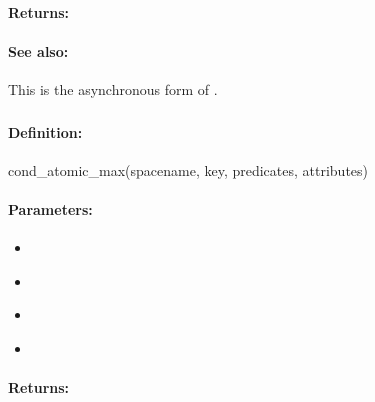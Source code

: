 \paragraph{Returns:}


\paragraph{See also:}  This is the asynchronous form of .

\pagebreak
\subsubsection{}
\label{api:ruby:cond_atomic_max}


\paragraph{Definition:}
\begin{rubycode}
cond_atomic_max(spacename, key, predicates, attributes)
\end{rubycode}

\paragraph{Parameters:}
\begin{itemize}[noitemsep]
\item {}\\

\item {}\\

\item {}\\

\item {}\\

\end{itemize}

\paragraph{Returns:}


